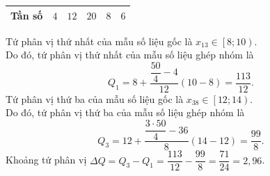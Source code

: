 \begin{bt}
{\begin{center}
\begin{tabular}{|m{3cm}|m{2cm}|m{2cm}|m{2cm}|m{2cm}|m{2cm}|}
				\centering\arraybackslash Tần số & 
				\centering\arraybackslash$4$  &
				\centering\arraybackslash$12$  &
				\centering\arraybackslash$20$  &
				\centering\arraybackslash$8$  &
				\centering\arraybackslash$6$ \\ 
				 \hline
			\end{tabular}
		\end{center}
		Tứ phân vị thứ  nhất của mẫu số liệu gốc là $x_{13}\in \left[8;10\right)$.\\ Do đó, tứ phân vị thứ nhất của mẫu số liệu ghép nhóm là
		 $$Q_1=8+\dfrac{\dfrac{50}{4}-4}{12}\left(10-8\right)=\dfrac{113}{12}.$$
		Tứ phân vị thứ ba của mẫu số liệu gốc  là $x_{38}\in \left[12;14\right)$.\\ Do đó, tứ phân vị thứ ba của mẫu số liệu ghép nhóm là
		 $$Q_3=12+\dfrac{\dfrac{3 \cdot 50}{4}-36}{8}\left(14-12\right)=\dfrac{99}{8}.$$
		Khoảng tứ phân vị  $\Delta Q=Q_3-Q_1=\dfrac{113}{12}-\dfrac{99}{8}=\dfrac{71}{24}=2{,}96$.
	 }
\end{bt}



